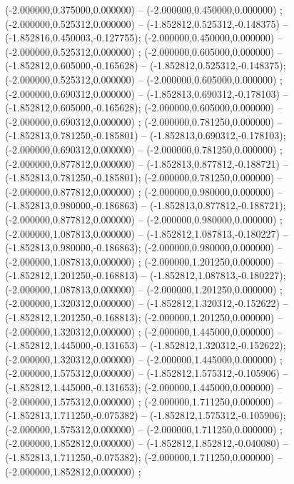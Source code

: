  (-2.000000,0.375000,0.000000) -- (-2.000000,0.450000,0.000000) ;
 (-2.000000,0.525312,0.000000) -- (-1.852812,0.525312,-0.148375) -- (-1.852816,0.450003,-0.127755);
 (-2.000000,0.450000,0.000000) -- (-2.000000,0.525312,0.000000) ;
 (-2.000000,0.605000,0.000000) -- (-1.852812,0.605000,-0.165628) -- (-1.852812,0.525312,-0.148375);
 (-2.000000,0.525312,0.000000) -- (-2.000000,0.605000,0.000000) ;
 (-2.000000,0.690312,0.000000) -- (-1.852813,0.690312,-0.178103) -- (-1.852812,0.605000,-0.165628);
 (-2.000000,0.605000,0.000000) -- (-2.000000,0.690312,0.000000) ;
 (-2.000000,0.781250,0.000000) -- (-1.852813,0.781250,-0.185801) -- (-1.852813,0.690312,-0.178103);
 (-2.000000,0.690312,0.000000) -- (-2.000000,0.781250,0.000000) ;
 (-2.000000,0.877812,0.000000) -- (-1.852813,0.877812,-0.188721) -- (-1.852813,0.781250,-0.185801);
 (-2.000000,0.781250,0.000000) -- (-2.000000,0.877812,0.000000) ;
 (-2.000000,0.980000,0.000000) -- (-1.852813,0.980000,-0.186863) -- (-1.852813,0.877812,-0.188721);
 (-2.000000,0.877812,0.000000) -- (-2.000000,0.980000,0.000000) ;
 (-2.000000,1.087813,0.000000) -- (-1.852812,1.087813,-0.180227) -- (-1.852813,0.980000,-0.186863);
 (-2.000000,0.980000,0.000000) -- (-2.000000,1.087813,0.000000) ;
 (-2.000000,1.201250,0.000000) -- (-1.852812,1.201250,-0.168813) -- (-1.852812,1.087813,-0.180227);
 (-2.000000,1.087813,0.000000) -- (-2.000000,1.201250,0.000000) ;
 (-2.000000,1.320312,0.000000) -- (-1.852812,1.320312,-0.152622) -- (-1.852812,1.201250,-0.168813);
 (-2.000000,1.201250,0.000000) -- (-2.000000,1.320312,0.000000) ;
 (-2.000000,1.445000,0.000000) -- (-1.852812,1.445000,-0.131653) -- (-1.852812,1.320312,-0.152622);
 (-2.000000,1.320312,0.000000) -- (-2.000000,1.445000,0.000000) ;
 (-2.000000,1.575312,0.000000) -- (-1.852812,1.575312,-0.105906) -- (-1.852812,1.445000,-0.131653);
 (-2.000000,1.445000,0.000000) -- (-2.000000,1.575312,0.000000) ;
 (-2.000000,1.711250,0.000000) -- (-1.852813,1.711250,-0.075382) -- (-1.852812,1.575312,-0.105906);
 (-2.000000,1.575312,0.000000) -- (-2.000000,1.711250,0.000000) ;
 (-2.000000,1.852812,0.000000) -- (-1.852812,1.852812,-0.040080) -- (-1.852813,1.711250,-0.075382);
 (-2.000000,1.711250,0.000000) -- (-2.000000,1.852812,0.000000) ;

